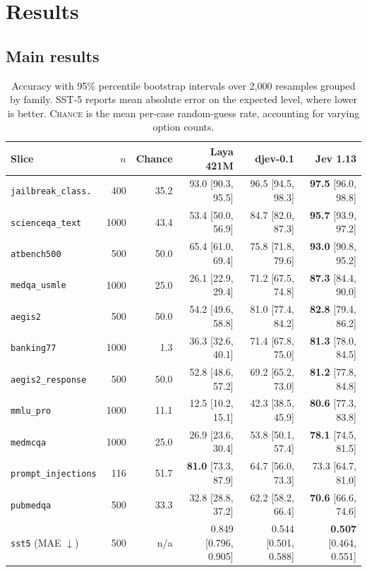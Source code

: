 \section{Results}
\label{sec:results}

\subsection{Main results}

\begin{table}[t]
\centering
\caption{Accuracy with 95\% percentile bootstrap intervals over 2{,}000 resamples grouped by family. SST-5 reports mean absolute error on the expected level, where lower is better. \textsc{Chance} is the mean per-case random-guess rate, accounting for varying option counts.}
\label{tab:main}
\small
\begin{tabular}{lrrrrr}
\toprule
Slice & $n$ & Chance & Laya 421M & djev-0.1 & Jev 1.13 \\
\midrule
\texttt{jailbreak\_class.}   & 400  & 35.2 & 93.0 \small{[90.3, 95.5]} & 96.5 \small{[94.5, 98.3]} & \textbf{97.5} \small{[96.0, 98.8]} \\
\texttt{scienceqa\_text}     & 1000 & 43.4 & 53.4 \small{[50.0, 56.9]} & 84.7 \small{[82.0, 87.3]} & \textbf{95.7} \small{[93.9, 97.2]} \\
\texttt{atbench500}          & 500  & 50.0 & 65.4 \small{[61.0, 69.4]} & 75.8 \small{[71.8, 79.6]} & \textbf{93.0} \small{[90.8, 95.2]} \\
\texttt{medqa\_usmle}        & 1000 & 25.0 & 26.1 \small{[22.9, 29.4]} & 71.2 \small{[67.5, 74.8]} & \textbf{87.3} \small{[84.4, 90.0]} \\
\texttt{aegis2}              & 500  & 50.0 & 54.2 \small{[49.6, 58.8]} & 81.0 \small{[77.4, 84.2]} & \textbf{82.8} \small{[79.4, 86.2]} \\
\texttt{banking77}           & 1000 & 1.3  & 36.3 \small{[32.6, 40.1]} & 71.4 \small{[67.8, 75.0]} & \textbf{81.3} \small{[78.0, 84.5]} \\
\texttt{aegis2\_response}    & 500  & 50.0 & 52.8 \small{[48.6, 57.2]} & 69.2 \small{[65.2, 73.0]} & \textbf{81.2} \small{[77.8, 84.8]} \\
\texttt{mmlu\_pro}           & 1000 & 11.1 & 12.5 \small{[10.2, 15.1]} & 42.3 \small{[38.5, 45.9]} & \textbf{80.6} \small{[77.3, 83.8]} \\
\texttt{medmcqa}             & 1000 & 25.0 & 26.9 \small{[23.6, 30.4]} & 53.8 \small{[50.1, 57.4]} & \textbf{78.1} \small{[74.5, 81.5]} \\
\texttt{prompt\_injections}  & 116  & 51.7 & \textbf{81.0} \small{[73.3, 87.9]} & 64.7 \small{[56.0, 73.3]} & 73.3 \small{[64.7, 81.0]} \\
\texttt{pubmedqa}            & 500  & 33.3 & 32.8 \small{[28.8, 37.2]} & 62.2 \small{[58.2, 66.4]} & \textbf{70.6} \small{[66.6, 74.6]} \\
\midrule
\texttt{sst5} (MAE $\downarrow$) & 500 & n/a & 0.849 \small{[0.796, 0.905]} & 0.544 \small{[0.501, 0.588]} & \textbf{0.507} \small{[0.464, 0.551]} \\
\bottomrule
\end{tabular}
\end{table}

